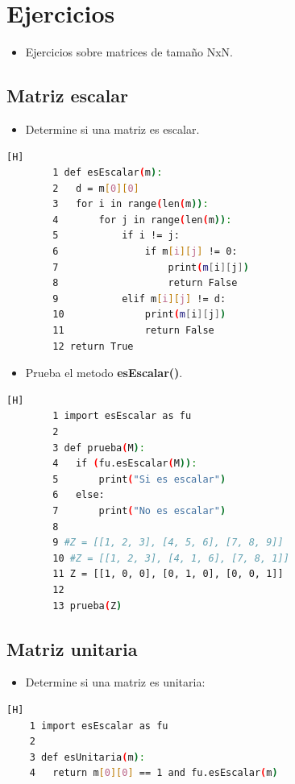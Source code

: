 \documentclass{article}
\begin{document}
	
	\section{Ejercicios}
	\begin{itemize}
		\item Ejercicios sobre matrices de tamaño NxN.
	\end{itemize}		
	
	\subsection{Matriz escalar}
	
	\begin{itemize}
		\item Determine si una matriz es escalar.
	\end{itemize}
	\begin{lstlisting}[language=bash,caption={esEscalar.py}][H]
		1 def esEscalar(m):
		2 	d = m[0][0]
		3 	for i in range(len(m)):
		4 		for j in range(len(m)):
		5 			if i != j:
		6 				if m[i][j] != 0:
		7 					print(m[i][j])
		8 					return False
		9 			elif m[i][j] != d:
		10 				print(m[i][j])
		11 				return False
		12 return True
	\end{lstlisting}
	
	\begin{itemize}
		\item Prueba el metodo \textbf{esEscalar()}.
	\end{itemize}
\begin{lstlisting}[language=bash,caption={testEsEscalar.py}][H]
		1 import esEscalar as fu
		2
		3 def prueba(M):
		4 	if (fu.esEscalar(M)):
		5 		print("Si es escalar")
		6 	else:
		7 		print("No es escalar")
		8
		9 #Z = [[1, 2, 3], [4, 5, 6], [7, 8, 9]]
		10 #Z = [[1, 2, 3], [4, 1, 6], [7, 8, 1]]
		11 Z = [[1, 0, 0], [0, 1, 0], [0, 0, 1]]
		12
		13 prueba(Z)
	\end{lstlisting}
	
	\subsection{Matriz unitaria}
	\begin{itemize}
		\item Determine si una matriz es unitaria:
	\end{itemize}		
	\begin{lstlisting}[language=bash,caption={esUnitaria.py}][H]
	1 import esEscalar as fu
	2
	3 def esUnitaria(m):
	4 	return m[0][0] == 1 and fu.esEscalar(m)
		
	\end{lstlisting}
	
\end{document}
